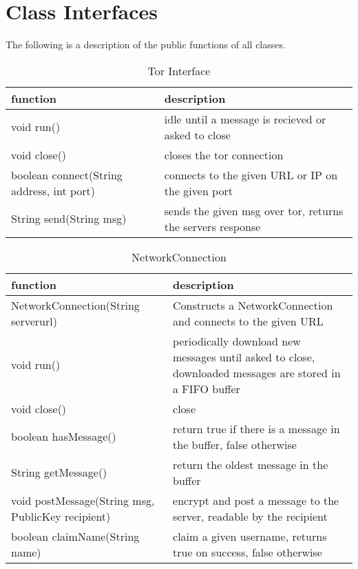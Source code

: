 \section{Class Interfaces}
The following is a description of the public functions of all classes.

\begin{table}[h]
    \centering
    \begin{tabular}{ll}
    function                                  & description\\ \hline
    void run()                                & idle until a message is recieved or asked to close\\
    void close()                              & closes the tor connection\\
    boolean connect(String address, int port) & connects to the given URL or IP on the given port\\
    String send(String msg)                   & sends the given msg over tor, returns the servers response\\    
    \end{tabular}
    \caption{Tor Interface}
\end{table}

\begin{table}[h]
    \centering
    \begin{tabular}{ll}
    function                            & description\\ \hline
    NetworkConnection(String serverurl) & Constructs a NetworkConnection and connects to the given URL\\
    void run()                          & periodically download new messages until asked to close, downloaded messages are stored in a FIFO buffer\\
    void close()                        & close\\
    boolean hasMessage()                & return true if there is a message in the buffer, false otherwise\\
    String getMessage()                 & return the oldest message in the buffer\\
    void postMessage(String msg, PublicKey recipient) & encrypt and post a message to the server, readable by the recipient\\
    boolean claimName(String name)      & claim a given username, returns true on success, false otherwise\\    
    \end{tabular}
    \caption{NetworkConnection}
\end{table}

